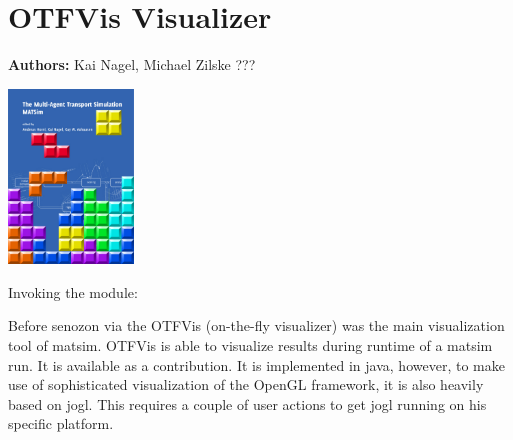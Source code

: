 \chapter{OTFVis Visualizer}
\label{ch:otfvis}

\hfill \textbf{Authors:} Kai Nagel, Michael Zilske ???

\begin{center} \includegraphics[width=0.25\textwidth, angle=0]{frontmatter/figures/MATSimBook} \end{center}


\begin{compactitem}
\item Invoking the module: 
\end{compactitem}

Before senozon via the OTFVis (on-the-fly visualizer) \citep[][]{Strippgen_PhDThesis_2009} was the main visualization tool of \gls{matsim}. OTFVis is able to visualize results during runtime of a \gls{matsim} run. It is available as a contribution. It is implemented in \gls{java}, however, to make use of sophisticated visualization of the OpenGL framework, it is also heavily based on jogl. This requires a couple of user actions to get jogl running on his specific platform. 







